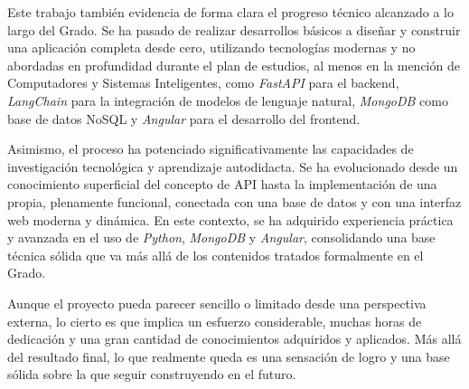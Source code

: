 Este trabajo también evidencia de forma clara el progreso técnico alcanzado a lo largo del Grado. Se ha pasado de realizar desarrollos básicos a diseñar y construir una aplicación completa desde cero, utilizando tecnologías modernas y no abordadas en profundidad durante el plan de estudios, al menos en la mención de Computadores y Sistemas Inteligentes, como \textit{FastAPI} para el backend, \textit{LangChain} para la integración de modelos de lenguaje natural, \textit{MongoDB} como base de datos NoSQL y \textit{Angular} para el desarrollo del frontend.

Asimismo, el proceso ha potenciado significativamente las capacidades de investigación tecnológica y aprendizaje autodidacta. Se ha evolucionado desde un conocimiento superficial del concepto de API hasta la implementación de una propia, plenamente funcional, conectada con una base de datos y con una interfaz web moderna y dinámica. En este contexto, se ha adquirido experiencia práctica y avanzada en el uso de \textit{Python}, \textit{MongoDB} y \textit{Angular}, consolidando una base técnica sólida que va más allá de los contenidos tratados formalmente en el Grado.

Aunque el proyecto pueda parecer sencillo o limitado desde una perspectiva externa, lo cierto es que implica un esfuerzo considerable, muchas horas de dedicación y una gran cantidad de conocimientos adquiridos y aplicados. Más allá del resultado final, lo que realmente queda es una sensación de logro y una base sólida sobre la que seguir construyendo en el futuro.

